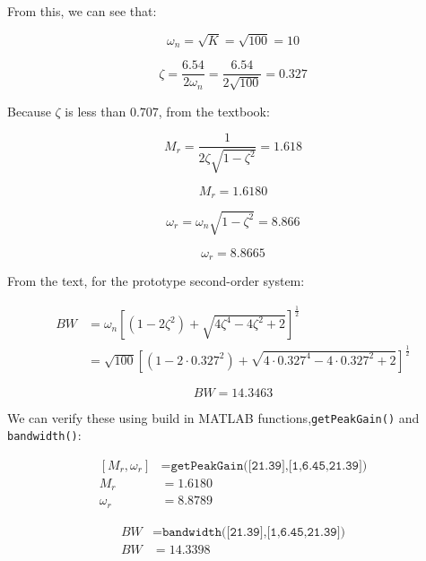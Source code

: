 \documentclass[12pt, letterpaper]{../assignment}
\begin{document}
From this, we can see that:

$$ \omega_n = \sqrt{K} = \sqrt{100} = 10 $$

$$ \zeta = \frac{6.54}{2 \omega_n} = \frac{6.54}{2 \sqrt{100}} = 0.327 $$

Because $\zeta$ is less than $0.707$, from the textbook:

$$ M_r = \frac{1}{2 \zeta \sqrt{1- \zeta^2}} = 1.618$$

\begin{answer}
    $$ M_r = 1.6180 $$
\end{answer}

$$ \omega_r = \omega_n \sqrt{1- \zeta^2} = 8.866$$

\begin{answer}
    $$ \omega_r = 8.8665 $$
\end{answer}

From the text, for the prototype second-order system:

\begin{equation*}
    \begin{aligned}
        BW &= \omega_n \left[ (1 - 2 \zeta^2) + \sqrt{ 4 \zeta^4 - 4 \zeta^2 + 2 } \right]^{\frac{1}{2}}\\
           &= \sqrt{100} \left[ (1 - 2 \cdot 0.327^2) + \sqrt{ 4 \cdot 0.327^4 - 4 \cdot 0.327^2 + 2 } \right]^{\frac{1}{2}}
    \end{aligned}
\end{equation*}

\begin{answer}
    $$ BW = 14.3463 $$
\end{answer}

We can verify these using build in MATLAB functions,\texttt{getPeakGain()} and\\ \texttt{bandwidth()}:

\begin{equation*}
    \begin{aligned}
        [M_r,\omega_r] &= \texttt{getPeakGain([21.39],[1,6.45,21.39])}\\
        M_r &= 1.6180\\
        \omega_r &= 8.8789
    \end{aligned}
\end{equation*}

\begin{equation*}
    \begin{aligned}
        BW &= \texttt{bandwidth([21.39],[1,6.45,21.39])}\\
        BW &= 14.3398
    \end{aligned}
\end{equation*}
\end{document}
